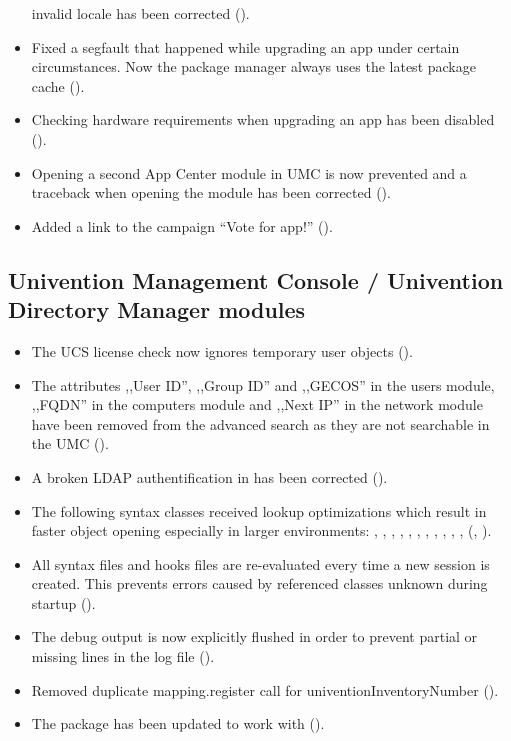 \begin{itemize}
  invalid locale has been corrected ().
\item Fixed a segfault that happened while upgrading an app under certain
  circumstances. Now the package manager always uses the latest package cache
  ().
\item Checking hardware requirements when upgrading an app has been disabled
  ().
\item Opening a second App Center module in UMC is now prevented and a traceback
  when opening the module has been corrected ().
\item Added a link to the campaign ``Vote for app!'' ().
\end{itemize}

\subsection{Univention Management Console / Univention Directory Manager modules}
\begin{itemize}
\item The UCS license check now ignores temporary user objects ().
\item The attributes ,,User ID'', ,,Group ID'' and ,,GECOS'' in the users module, ,,FQDN'' in the computers
  module and ,,Next IP'' in the network module have been removed from the advanced search as they
  are not searchable in the UMC ().
\item A broken LDAP authentification in  has been corrected ().
\item The following syntax classes received lookup optimizations
  which result in faster object opening especially in larger environments:
  , , , , ,
  , , ,
  , , , 
  (, ).
\item All syntax files and hooks files are re-evaluated every time a new
  session is created. This prevents errors caused by referenced classes unknown
  during  startup
  ().
\item The debug output is now explicitly flushed in order to prevent
  partial or missing lines in the log file ().
\item Removed duplicate mapping.register call for univentionInventoryNumber ().
\item The package  has been updated to work with  ().
\end{itemize}

